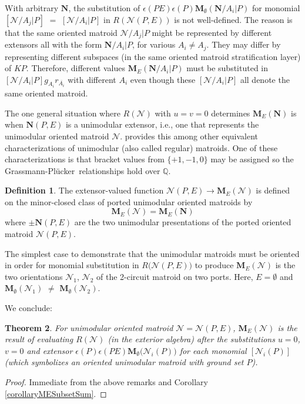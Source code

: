\documentclass[12pt]{article}
\newtheorem{theorem}{Theorem}[section]
\theoremstyle{definition}
\newtheorem{definition}[theorem]{Definition}
\newcommand{\scomp}[1]{\ensuremath{\overline{#1}}}
\newcommand{\FieldK}{\ensuremath{K}}
\newcommand{\ext}[1]{\ensuremath{\mathbf{#1}}}
\newcommand{\Plucker}{Pl\"{u}cker\ }
\begin{document}
With arbitrary $\ext{N}$, the substitution
of $\epsilon(PE)\epsilon(P)\ext{M}_{\emptyset}(\ext{N}/A_i|P)$ for 
monomial $[\mathcal{N}/A_j|P]$ 
$=$ $[\mathcal{N}/A_i|P]$ 
in $R(\mathcal{N}(P,E))$ is not 
well-defined.  
The reason is that the same oriented matroid
$\mathcal{N}/A_j|P$ might be represented by different extensors all
with the form $\ext{N}/A_i|P$, for various $A_i\neq A_j$.  
They may differ by representing different subspaces 
(in the same oriented matroid stratification\cite[]{OMBOOK}
layer) of  $\FieldK P$.  
Therefore, different values $\ext{M}_E(\ext{N}/A_i|P)$ must be
substituted in $[\mathcal{N}/A_i|P]g_{A_i}r_{\scomp{A_i}}$ with
different $A_i$ even though these $[\mathcal{N}/A_i|P]$ all denote the same
oriented matroid.

The one general situation where $R(\mathcal{N})$ with $u=v=0$
determines $\ext{M}_E(\ext{N})$ is when $\ext{N}(P,E)$ is 
a unimodular extensor, i.e., one that represents the unimodular oriented 
matroid $\mathcal{N}$.  
\cite[Theorem 3.1.1, p. 41]{CombinatorialGeometries} 
provides this among other equivalent characterizations
of unimodular (also called regular) matroids.  
One of these characterizations is that
bracket values from $\{+1, -1, 0\}$ may be assigned so the 
Grassmann-\Plucker relationships hold over $\mathbb{Q}$.

\begin{definition}
\label{DefMUOM}
The extensor-valued function 
$\mathcal{N}(P,E)\rightarrow\ext{M}_E(\mathcal{N})$ is defined on the 
minor-closed class of ported unimodular oriented matroids by
\[
\ext{M}_E(\mathcal{N})=\ext{M}_E(\ext{N})
\]
where $\pm\ext{N}(P,E)$ are the two unimodular presentations of 
the ported oriented matroid $\mathcal{N}(P,E)$.
\end{definition}

The simplest case to demonstrate that the unimodular matroids
must be oriented in order for monomial substitution in
$R\big(\mathcal{N}(P,E)\big)$ to produce $\ext{M}_E(\mathcal{N})$ is
the two orientations $\mathcal{N}_1$, $\mathcal{N}_2$
of the 2-circuit matroid on two ports.  Here, $E=\emptyset$
and $\ext{M}_{\emptyset}(\mathcal{N}_1)$ $\neq$ 
$\ext{M}_{\emptyset}(\mathcal{N}_2)$.

We conclude:

\begin{theorem}
\label{MEofUnimodularExt}
For unimodular oriented matroid
$\mathcal{N}=\mathcal{N}(P,E)$, $\ext{M}_E(\mathcal{N})$ is the result of evaluating 
$R(\mathcal{N})$ (in the exterior algebra) after the substitutions
$u=0$, $v=0$ and extensor 
$\epsilon(P)\epsilon(PE)\ext{M}_\emptyset\big(\mathcal{N}_i(P)\big)$
for each monomial $[\mathcal{N}_i(P)]$ (which symbolizes an oriented 
unimodular matroid with ground set $P$).
\end{theorem}
\begin{proof}
Immediate from the above remarks and Corollary \ref{corollaryMESubsetSum}.
\end{proof}
\end{document}
